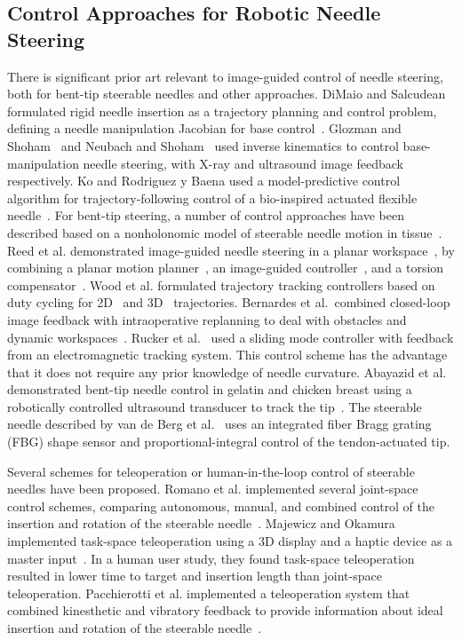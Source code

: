 \subsection{Control Approaches for Robotic Needle Steering}
There is significant prior art relevant to image-guided control of needle steering, both for bent-tip steerable needles and other approaches. DiMaio and Salcudean formulated rigid needle insertion as a trajectory planning and control problem, defining a needle manipulation Jacobian for base control~\cite{DiMaio2005}. Glozman and Shoham~\cite{Glozman2007} and Neubach and Shoham~\cite{Neubach2010} used inverse kinematics to control base-manipulation needle steering, with X-ray and ultrasound image feedback respectively. Ko and Rodriguez y Baena used a model-predictive control algorithm for trajectory-following control of a bio-inspired actuated flexible needle~\cite{Ko2012}. For bent-tip steering, a number of control approaches have been described based on a nonholonomic model of steerable needle motion in tissue~\cite{Webster2006}. Reed et al. demonstrated image-guided needle steering in a planar workspace~\cite{Reed2011}, by combining a planar motion planner~\cite{Alterovitz2008}, an image-guided controller~\cite{Kallem2009}, and a torsion compensator~\cite{Reed2009}. Wood et al. formulated trajectory tracking controllers based on duty cycling for 2D~\cite{Wood2010} and 3D~\cite{Wood2013} trajectories. Bernardes et al.\ combined closed-loop image feedback with intraoperative replanning to deal with obstacles and dynamic workspaces~\cite{Bernardes2013}. Rucker et al.~\cite{Rucker2013} used a sliding mode controller with feedback from an electromagnetic tracking system. This control scheme has the advantage that it does not require any prior knowledge of needle curvature. Abayazid et al. demonstrated bent-tip needle control in gelatin and chicken breast using a robotically controlled ultrasound transducer to track the tip~\cite{Abayazid2014}. The steerable needle described by van de Berg et al.~\cite{vandeBerg2015} uses an integrated fiber Bragg grating (FBG) shape sensor and proportional-integral control of the tendon-actuated tip. 

Several schemes for teleoperation or human-in-the-loop control of steerable needles have been proposed. Romano et al. implemented several joint-space control schemes, comparing autonomous, manual, and combined control of the insertion and rotation of the steerable needle~\cite{Romano2007}. Majewicz and Okamura implemented task-space teleoperation using a 3D display and a haptic device as a master input~\cite{Majewicz2013}. In a human user study, they found task-space teleoperation resulted in lower time to target and insertion length than joint-space teleoperation. Pacchierotti et al. implemented a teleoperation system that combined kinesthetic and
vibratory feedback to provide information about ideal insertion and rotation of the steerable needle~\cite{Pacchierotti2014}.

